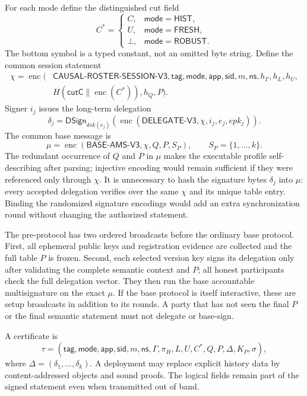 \documentclass[11pt]{article}
\theoremstyle{definition}
\newcommand{\enc}{\operatorname{enc}}
\begin{document}
For each mode define the distinguished cut field
\[
 C^*=\begin{cases}
 C,&\mathsf{mode}=\mathsf{HIST},\\
 U,&\mathsf{mode}=\mathsf{FRESH},\\
 \bot,&\mathsf{mode}=\mathsf{ROBUST}.
 \end{cases}
\]
The bottom symbol is a typed constant, not an omitted byte string.  Define the common session statement
\begin{align}
 \chi=\enc(&\mathsf{CAUSAL\mbox{-}ROSTER\mbox{-}SESSION\mbox{-}V3},
 \mathsf{tag},\mathsf{mode},\mathsf{app},\mathsf{sid},m,\mathsf{ns},h_\Gamma,h_L,h_U,\nonumber\\
 &H(\mathsf{cutC}\parallel\enc(C^*)),h_Q,P).
 \label{eq:session-statement}
\end{align}
Signer $i_j$ issues the long-term delegation
\begin{equation}
 \delta_j=\mathsf{DSign}_{dsk(e_j)}
   (\enc(\mathsf{DELEGATE\mbox{-}V3},\chi,i_j,e_j,epk_j)).
 \label{eq:delegation}
\end{equation}
The common base message is
\begin{equation}
 \mu=\enc(\mathsf{BASE\mbox{-}AMS\mbox{-}V3},\chi,Q,P,S_P),
 \qquad S_P=\{1,\ldots,k\}.
 \label{eq:context}
\end{equation}
The redundant occurrence of $Q$ and $P$ in $\mu$ makes the executable profile self-describing after parsing; injective encoding would remain sufficient if they were referenced only through $\chi$.  It is unnecessary to hash the signature bytes $\delta_j$ into $\mu$: every accepted delegation verifies over the same $\chi$ and its unique table entry.  Binding the randomized signature encodings would add an extra synchronization round without changing the authorized statement.

The pre-protocol has two ordered broadcasts before the ordinary base protocol.  First, all ephemeral public keys and registration evidence are collected and the full table $P$ is frozen.  Second, each selected version key signs its delegation only after validating the complete semantic context and $P$; all honest participants check the full delegation vector.  They then run the base accountable multisignature on the exact $\mu$.  If the base protocol is itself interactive, these are setup broadcasts in addition to its rounds.  A party that has not seen the final $P$ or the final semantic statement must not delegate or base-sign.

A certificate is
\[
 \tau=(\mathsf{tag},\mathsf{mode},\mathsf{app},\mathsf{sid},m,\mathsf{ns},\Gamma,\pi_H,
 L,U,C^*,Q,P,\Delta,K_P,\sigma),
\]
where $\Delta=(\delta_1,\ldots,\delta_k)$.  A deployment may replace explicit history data by content-addressed objects and sound proofs.  The logical fields remain part of the signed statement even when transmitted out of band.
\end{document}
